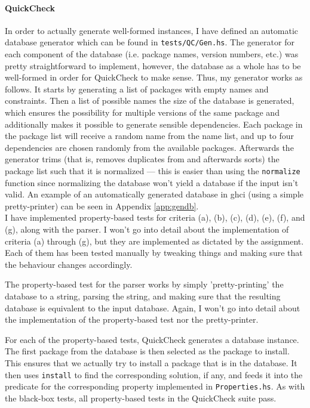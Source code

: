 \paragraph{QuickCheck}
In order to actually generate well-formed instances, I have defined an automatic database generator which can be found in \texttt{tests/QC/Gen.hs}. The generator for each component of the database (i.e. package names, version numbers, etc.) was pretty straightforward to implement, however, the database as a whole has to be well-formed in order for QuickCheck to make sense. Thus, my generator works as follows. It starts by generating a list of packages with empty names and constraints. Then a list of possible names the size of the database is generated, which ensures the possibility for multiple versions of the same package and additionally makes it possible to generate sensible dependencies. Each package in the package list will receive a random name from the name list, and up to four dependencies are chosen randomly from the available packages. Afterwards the generator trims (that is, removes duplicates from and afterwards sorts) the package list such that it is normalized --- this is easier than using the \texttt{normalize} function since normalizing the database won't yield a database if the input isn't valid. An example of an automatically generated database in ghci (using a simple pretty-printer) can be seen in Appendix \ref{app:gendb}. \\

\noindent I have implemented property-based tests for criteria (a), (b), (c), (d), (e), (f), and (g), along with the parser. I won't go into detail about the implementation of criteria (a) through (g), but they are implemented as dictated by the assignment. Each of them has been tested manually by tweaking things and making sure that the behaviour changes accordingly.

The property-based test for the parser works by simply 'pretty-printing' the database to a string, parsing the string, and making sure that the resulting database is equivalent to the input database. Again, I won't go into detail about the implementation of the property-based test nor the pretty-printer.

For each of the property-based tests, QuickCheck generates a database instance. The first package from the database is then selected as the package to install. This ensures that we actually try to install a package that is in the database. It then uses \texttt{install} to find the corresponding solution, if any, and feeds it into the predicate for the corresponding property implemented in \texttt{Properties.hs}. As with the black-box tests, all property-based tests in the QuickCheck suite pass.


